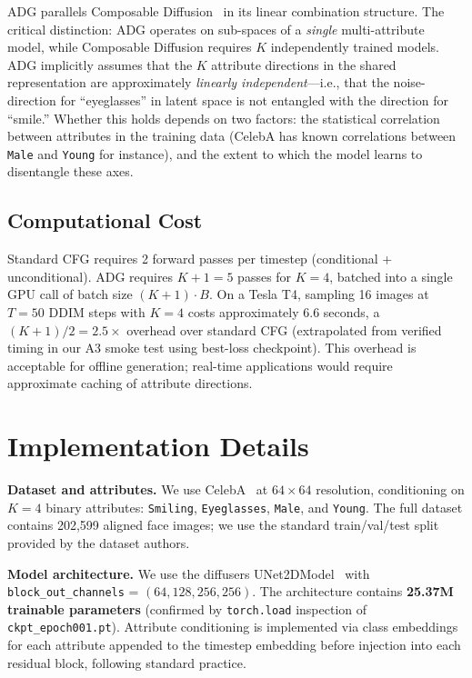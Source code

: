 \documentclass{article}
\begin{document}
ADG parallels Composable Diffusion~\citep{liu2022composable} in its linear combination structure. The critical distinction: ADG operates on sub-spaces of a \emph{single} multi-attribute model, while Composable Diffusion requires $K$ independently trained models. ADG implicitly assumes that the $K$ attribute directions in the shared representation are approximately \emph{linearly independent}—i.e., that the noise-direction for ``eyeglasses'' in latent space is not entangled with the direction for ``smile.'' Whether this holds depends on two factors: the statistical correlation between attributes in the training data (CelebA has known correlations between \texttt{Male} and \texttt{Young} for instance), and the extent to which the model learns to disentangle these axes.

\subsection{Computational Cost}

Standard CFG requires 2 forward passes per timestep (conditional + unconditional). ADG requires $K{+}1 = 5$ passes for $K{=}4$, batched into a single GPU call of batch size $(K{+}1) \cdot B$. On a Tesla T4, sampling 16 images at $T{=}50$ DDIM steps with $K{=}4$ costs approximately 6.6 seconds, a $(K{+}1)/2 = 2.5\times$ overhead over standard CFG (extrapolated from verified timing in our A3 smoke test using best-loss checkpoint). This overhead is acceptable for offline generation; real-time applications would require approximate caching of attribute directions.

\section{Implementation Details}
\label{sec:impl}

\textbf{Dataset and attributes.} We use CelebA~\citep{liu2015celeba} at $64{\times}64$ resolution, conditioning on $K{=}4$ binary attributes: \texttt{Smiling}, \texttt{Eyeglasses}, \texttt{Male}, and \texttt{Young}. The full dataset contains 202,599 aligned face images; we use the standard train/val/test split provided by the dataset authors.

\textbf{Model architecture.} We use the diffusers UNet2DModel~\citep{diffusers} with \texttt{block\_out\_channels} = $(64, 128, 256, 256)$. The architecture contains \textbf{25.37M trainable parameters} (confirmed by \texttt{torch.load} inspection of \texttt{ckpt\_epoch001.pt}). Attribute conditioning is implemented via class embeddings for each attribute appended to the timestep embedding before injection into each residual block, following standard practice.
\end{document}
